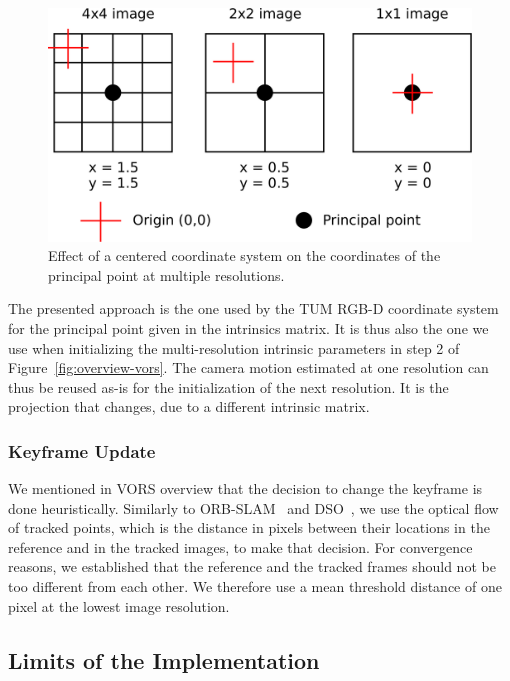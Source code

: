 \begin{figure}[t]
	\centering
	\includegraphics[width=\linewidth]{assets/img/multiscale-intrinsics.pdf}
	\caption{Effect of a centered coordinate system on
	the coordinates of the principal point at multiple resolutions.}%
	\label{fig:multiscale-intrinsics}
\end{figure}

The presented approach is the one used by the TUM RGB-D coordinate system
for the principal point given in the intrinsics matrix.
It is thus also the one we use when initializing the multi-resolution intrinsic
parameters in step 2 of Figure~\ref{fig:overview-vors}.
The camera motion estimated at one resolution can thus be reused as-is
for the initialization of the next resolution.
It is the projection that changes, due to a different intrinsic matrix.

\subsubsection{Keyframe Update}%
\label{ssub:keyframe-update}

We mentioned in VORS overview that the decision to change the keyframe is done heuristically.
Similarly to ORB-SLAM~\cite{mur2015orb} and DSO~\cite{engel2017direct},
we use the optical flow of tracked points, which is
the distance in pixels between their locations in the reference and in the tracked images,
to make that decision.
For convergence reasons, we established that the reference and the tracked frames
should not be too different from each other.
We therefore use a mean threshold distance of one pixel at the lowest image resolution.


\subsection{Limits of the Implementation}%
\label{sub:limits-implementation}

